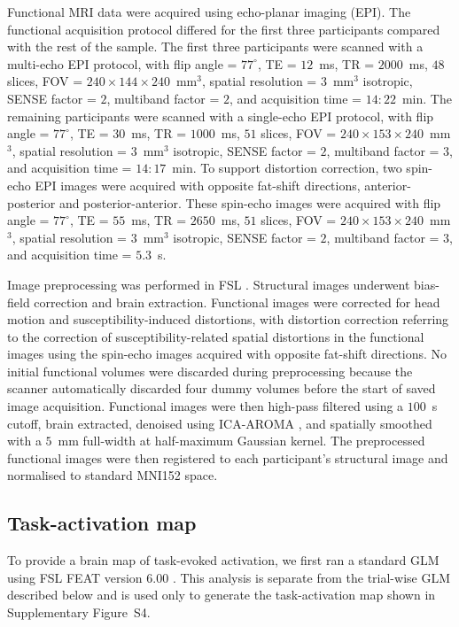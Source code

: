 \documentclass[utf8]{frontiers_suppmat}
\begin{document}
Functional MRI data were acquired using echo-planar imaging (EPI). The functional acquisition protocol differed for the first three participants compared with the rest of the sample. The first three participants were scanned with a multi-echo EPI protocol, with flip angle = $77^\circ$, TE = $12$~ms, TR = $2000$~ms, $48$ slices, FOV = $240 \times 144 \times 240$~mm$^3$, spatial resolution = $3$~mm$^3$ isotropic, SENSE factor = $2$, multiband factor = $2$, and acquisition time = $14{:}22$~min. The remaining participants were scanned with a single-echo EPI protocol, with flip angle = $77^\circ$, TE = $30$~ms, TR = $1000$~ms, $51$ slices, FOV = $240 \times 153 \times 240$~mm$^3$, spatial resolution = $3$~mm$^3$ isotropic, SENSE factor = $2$, multiband factor = $3$, and acquisition time = $14{:}17$~min. To support distortion correction, two spin-echo EPI images were acquired with opposite fat-shift directions, anterior-posterior and posterior-anterior. These spin-echo images were acquired with flip angle = $77^\circ$, TE = $55$~ms, TR = $2650$~ms, $51$ slices, FOV = $240 \times 153 \times 240$~mm$^3$, spatial resolution = $3$~mm$^3$ isotropic, SENSE factor = $2$, multiband factor = $3$, and acquisition time = $5.3$~s.

Image preprocessing was performed in FSL \citep{smith2004advances}. Structural images underwent bias-field correction and brain extraction. Functional images were corrected for head motion and susceptibility-induced distortions, with distortion correction referring to the correction of susceptibility-related spatial distortions in the functional images using the spin-echo images acquired with opposite fat-shift directions. No initial functional volumes were discarded during preprocessing because the scanner automatically discarded four dummy volumes before the start of saved image acquisition. Functional images were then high-pass filtered using a $100$~s cutoff, brain extracted, denoised using ICA-AROMA \citep{pruim2015ica}, and spatially smoothed with a $5$~mm full-width at half-maximum Gaussian kernel. The preprocessed functional images were then registered to each participant's structural image and normalised to standard MNI152 space.

\subsection{Task-activation map}
To provide a brain map of task-evoked activation, we first ran a standard GLM using FSL FEAT version 6.00 \citep{jenkinson2012fsl}. This analysis is separate from the trial-wise GLM described below and is used only to generate the task-activation map shown in Supplementary Figure~S4.
\end{document}
